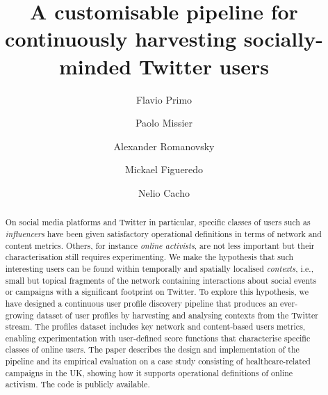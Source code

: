 \documentclass[runningheads]{llncs}
\begin{document}
    \title{A customisable pipeline for continuously harvesting socially-minded Twitter users}
    \author{Flavio Primo \and
    Paolo Missier \and
    Alexander Romanovsky \and
    Mickael Figueredo \and
    Nelio Cacho}
    
    \maketitle       %
    
    \begin{abstract}
    	On social media platforms and Twitter in particular, specific classes of users such as \textit{influencers}  have been given satisfactory operational definitions in terms of  network and content metrics.
    	Others, for instance \textit{online activists}, are not less important but their characterisation still requires experimenting.
    	We make  the hypothesis that such interesting users can be found within temporally and spatially localised \textit{contexts}, i.e., small but topical fragments of the network containing interactions about social events or campaigns with a significant footprint on Twitter.
    	To explore this hypothesis, we have designed a continuous user profile discovery pipeline that produces an ever-growing dataset of user profiles by harvesting and analysing contexts from the Twitter stream.
    	The profiles dataset includes key network and content-based users metrics, enabling experimentation with user-defined score functions that characterise specific classes of online users.
        The paper describes the design and implementation of  the pipeline and its empirical evaluation on a case study consisting of healthcare-related campaigns in the UK, showing how it supports operational definitions of online activism. The code is publicly available.
    	
    \end{abstract}
    
\end{document}
